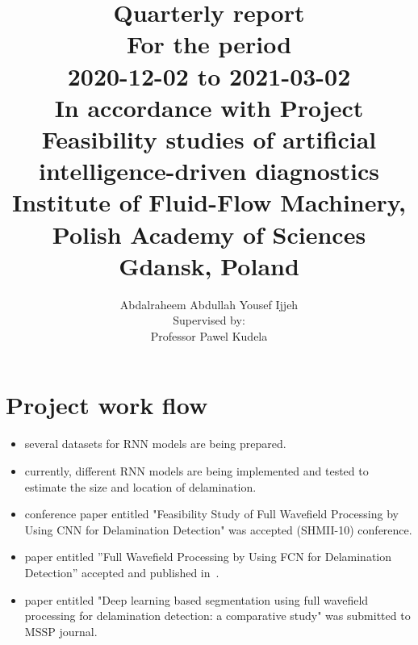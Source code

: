 \documentclass[11pt,a4paper]{report}
\author{Abdalraheem Abdullah Yousef Ijjeh \\
	Supervised by: \\
	Professor Pawel Kudela}
\title{\Huge Quarterly report \\
	\huge For the period \\ 2020-12-02 to 2021-03-02
	\\ \Large In accordance with Project\\
	Feasibility studies of artificial intelligence-driven diagnostics\\ Institute of Fluid-Flow Machinery, Polish Academy of Sciences
	\\ Gdansk, Poland}
\begin{document}
	\maketitle
	\newpage
	\section{Project work flow}
	\begin{itemize}
		\item several datasets for RNN models are being prepared.
		\item currently, different RNN models are being implemented and tested to estimate the size and location of delamination.
		\item conference paper entitled "Feasibility Study of Full Wavefield Processing by Using CNN for Delamination Detection" was accepted (SHMII-10) conference.
		\item paper entitled ”Full Wavefield Processing by Using FCN for Delamination Detection” accepted and published in~\cite{Ijjeh2021}. 
		\item paper entitled "Deep learning based segmentation using full wavefield processing for delamination detection: a comparative study" was submitted to MSSP journal.
	\end{itemize}


\end{document}
